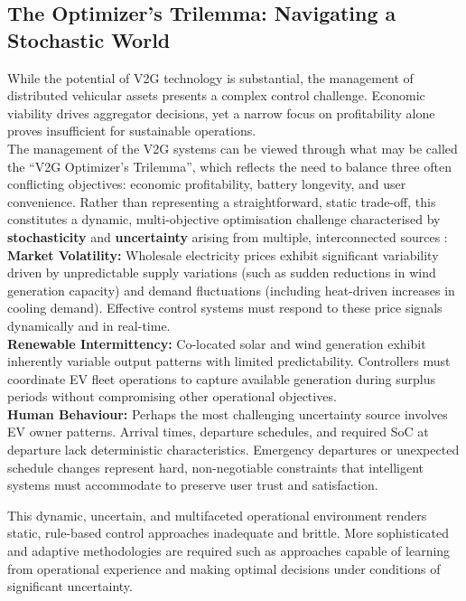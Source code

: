 \subsection{The Optimizer's Trilemma: Navigating a Stochastic World}
While the potential of V2G technology is substantial, the management of distributed vehicular assets presents a complex control challenge. Economic viability drives aggregator decisions, yet a narrow focus on profitability alone proves insufficient for sustainable operations. 
\\
\noindent
The management of the V2G systems can be viewed through what may be called the “V2G Optimizer’s Trilemma”, which reflects the need to balance three often conflicting objectives: economic profitability, battery longevity, and user convenience. Rather than representing a straightforward, static trade-off, this constitutes a dynamic, multi-objective optimisation challenge characterised by \textbf{stochasticity} and \textbf{uncertainty} arising from multiple, interconnected sources \cite{wang2022multi}:
\\
    \noindent
    \textbf{Market Volatility:} Wholesale electricity prices exhibit significant variability driven by unpredictable supply variations (such as sudden reductions in wind generation capacity) and demand fluctuations (including heat-driven increases in cooling demand). Effective control systems must respond to these price signals dynamically and in real-time.
 \\
    \noindent   
\textbf{Renewable Intermittency:} Co-located solar and wind generation exhibit inherently variable output patterns with limited predictability. Controllers must coordinate EV fleet operations to capture available generation during surplus periods without compromising other operational objectives.
    \\
    \noindent
  \textbf{Human Behaviour:} Perhaps the most challenging uncertainty source involves EV owner patterns. Arrival times, departure schedules, and required SoC at departure lack deterministic characteristics. Emergency departures or unexpected schedule changes represent hard, non-negotiable constraints that intelligent systems must accommodate to preserve user trust and satisfaction.

\noindent
This dynamic, uncertain, and multifaceted operational environment renders static, rule-based control approaches inadequate and brittle. More sophisticated and adaptive methodologies are required such as approaches capable of learning from operational experience and making optimal decisions under conditions of significant uncertainty.


